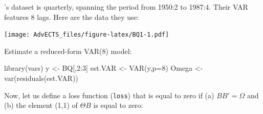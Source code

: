 \documentclass[
]{book}
\newenvironment{Shaded}{\begin{snugshade}}{\end{snugshade}}
\newcommand{\AttributeTok}[1]{\textcolor[rgb]{0.77,0.63,0.00}{#1}}
\newcommand{\DecValTok}[1]{\textcolor[rgb]{0.00,0.00,0.81}{#1}}
\newcommand{\FunctionTok}[1]{\textcolor[rgb]{0.00,0.00,0.00}{#1}}
\newcommand{\NormalTok}[1]{#1}
\newcommand{\OtherTok}[1]{\textcolor[rgb]{0.56,0.35,0.01}{#1}}
\newcommand{\SpecialCharTok}[1]{\textcolor[rgb]{0.00,0.00,0.00}{#1}}
\newcommand{\StringTok}[1]{\textcolor[rgb]{0.31,0.60,0.02}{#1}}
\theoremstyle{definition}
\theoremstyle{definition}
\theoremstyle{definition}
\theoremstyle{definition}
\theoremstyle{remark}
\begin{document}
\citet{Blanchard_Quah_1989}'s dataset is quarterly, spanning the period from 1950:2 to 1987:4. Their VAR features 8 lags. Here are the data they use:

\begin{Shaded}
\end{Shaded}

\texttt{[image: AdvECTS\_files/figure-latex/BQ1-1.pdf]}

Estimate a reduced-form VAR(8) model:

\begin{Shaded}
\begin{Highlighting}[]
\FunctionTok{library}\NormalTok{(vars)}
\NormalTok{y }\OtherTok{\textless{}{-}}\NormalTok{ BQ[,}\DecValTok{2}\SpecialCharTok{:}\DecValTok{3}\NormalTok{]}
\NormalTok{est.VAR }\OtherTok{\textless{}{-}} \FunctionTok{VAR}\NormalTok{(y,}\AttributeTok{p=}\DecValTok{8}\NormalTok{)}
\NormalTok{Omega }\OtherTok{\textless{}{-}} \FunctionTok{var}\NormalTok{(}\FunctionTok{residuals}\NormalTok{(est.VAR))}
\end{Highlighting}
\end{Shaded}

Now, let us define a loss function (\texttt{loss}) that is equal to zero if (a) \(BB'=\Omega\) and (b) the element (1,1) of \(\Theta B\) is equal to zero:
\end{document}
